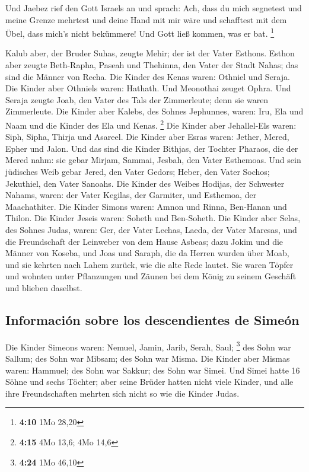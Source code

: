 Und Jaebez rief den Gott Israels an und sprach: Ach,
dass du mich segnetest und meine Grenze mehrtest und deine Hand mit mir
wäre und schafftest mit dem Übel, dass mich's nicht bekümmere! Und Gott
ließ kommen, was er bat. \footnote{\textbf{4:10} 1Mo 28,20}

 Kalub aber, der Bruder Suhas, zeugte Mehir; der ist der
Vater Esthons.  Esthon aber zeugte Beth-Rapha, Paseah und
Thehinna, den Vater der Stadt Nahas; das sind die Männer von Recha.
 Die Kinder des Kenas waren: Othniel und Seraja. Die
Kinder aber Othniels waren: Hathath.  Und Meonothai
zeuget Ophra. Und Seraja zeugte Joab, den Vater des Tals der
Zimmerleute; denn sie waren Zimmerleute.  Die Kinder aber
Kalebs, des Sohnes Jephunnes, waren: Iru, Ela und Naam und die Kinder
des Ela und Kenas. \footnote{\textbf{4:15} 4Mo 13,6; 4Mo 14,6}
 Die Kinder aber Jehallel-Els waren: Siph, Sipha, Thirja
und Asareel.  Die Kinder aber Esras waren: Jether, Mered,
Epher und Jalon. Und das sind die Kinder Bithjas, der Tochter Pharaos,
die der Mered nahm: sie gebar Mirjam, Sammai, Jesbah, den Vater
Esthemoas.  Und sein jüdisches Weib gebar Jered, den
Vater Gedors; Heber, den Vater Sochos; Jekuthiel, den Vater Sanoahs.
 Die Kinder des Weibes Hodijas, der Schwester Nahams,
waren: der Vater Kegilas, der Garmiter, und Esthemoa, der Maachathiter.
 Die Kinder Simons waren: Amnon und Rinna, Ben-Hanan und
Thilon. Die Kinder Jeseis waren: Soheth und Ben-Soheth. 
Die Kinder aber Selas, des Sohnes Judas, waren: Ger, der Vater Lechas,
Laeda, der Vater Maresas, und die Freundschaft der Leinweber von dem
Hause Asbeas;  dazu Jokim und die Männer von Koseba, und
Joas und Saraph, die da Herren wurden über Moab, und sie kehrten nach
Lahem zurück, wie die alte Rede lautet.  Sie waren Töpfer
und wohnten unter Pflanzungen und Zäunen bei dem König zu seinem
Geschäft und blieben daselbst.

\hypertarget{informaciuxf3n-sobre-los-descendientes-de-simeuxf3n}{%
\subsection{Información sobre los descendientes de
Simeón}\label{informaciuxf3n-sobre-los-descendientes-de-simeuxf3n}}

 Die Kinder Simeons waren: Nemuel, Jamin, Jarib, Serah,
Saul; \footnote{\textbf{4:24} 1Mo 46,10}  des Sohn war
Sallum; des Sohn war Mibsam; des Sohn war Misma.  Die
Kinder aber Mismas waren: Hammuel; des Sohn war Sakkur; des Sohn war
Simei.  Und Simei hatte 16 Söhne und sechs Töchter; aber
seine Brüder hatten nicht viele Kinder, und alle ihre Freundschaften
mehrten sich nicht so wie die Kinder Judas.

